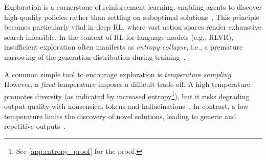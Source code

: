 %
Exploration is a cornerstone of reinforcement learning, enabling agents to discover high-quality policies rather than settling on suboptimal solutions~\citep{sutton1998reinforcement, ladosz2022exploration}. 
%
This principle becomes particularly vital in deep RL, where vast action spaces render exhaustive search infeasible.
%
In the context of RL for language models (e.g., RLVR), insufficient exploration often manifests as  \textit{entropy collapse}, i.e., a premature narrowing of the generation distribution during training~\citep{yu2025dapo, wang2025beyond, cui2025entropy}.
%  

A common simple tool to encourage exploration is \emph{temperature sampling}.
% 
However, a \textit{fixed} temperature imposes a difficult trade-off. 
%
A high temperature promotes diversity (as indicated by increased entropy\footnote{See \cref{app:entropy_proof} for the proof.}), but it risks degrading output quality with nonsensical tokens and hallucinations~\citep{renze-2024-effect, wang2025beyond}. 
%
In contrast, a low temperature limits the discovery of novel solutions, leading to generic and repetitive outputs~\citep{Holtzman2020The, guo2025deepseek}.
%

